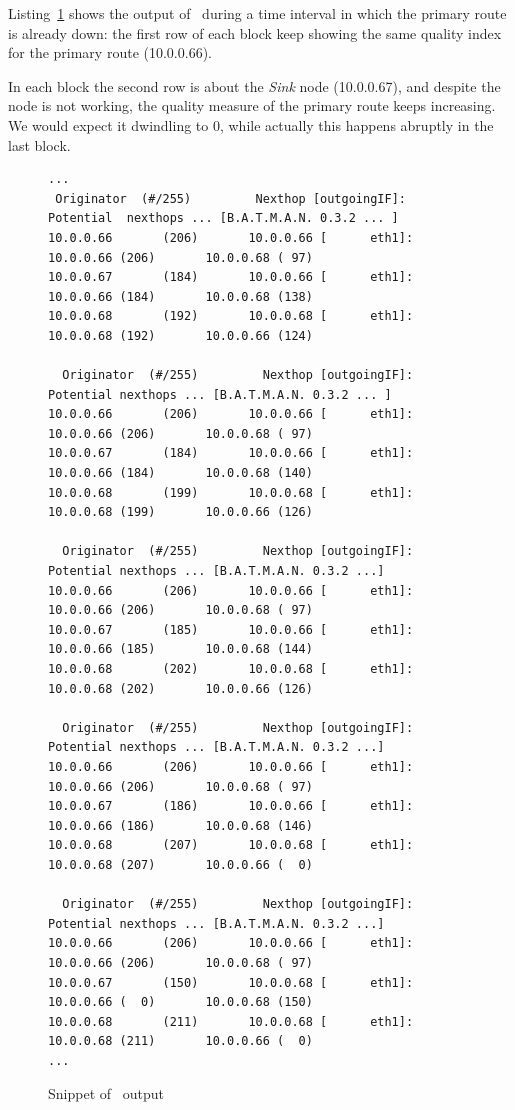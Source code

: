     Listing~\ref{lst:batman_log} shows the output of \batman\ during a
    time interval in which the primary route is already down: the first
    row of each block keep showing the same quality index for the primary
    route (10.0.0.66).

    In each block the second row is about the \emph{Sink} node
    (10.0.0.67), and despite the node is not working, the quality measure
    of the primary route keeps increasing. We would expect it dwindling to
    0, while actually this happens abruptly in the last block.

\begin{figure}[tbhp]
\begin{Verbatim}[fontsize=\footnotesize]
...
 Originator  (#/255)         Nexthop [outgoingIF]:   Potential  nexthops ... [B.A.T.M.A.N. 0.3.2 ... ]
10.0.0.66       (206)       10.0.0.66 [      eth1]:       10.0.0.66 (206)       10.0.0.68 ( 97)
10.0.0.67       (184)       10.0.0.66 [      eth1]:       10.0.0.66 (184)       10.0.0.68 (138)
10.0.0.68       (192)       10.0.0.68 [      eth1]:       10.0.0.68 (192)       10.0.0.66 (124)

  Originator  (#/255)         Nexthop [outgoingIF]:   Potential nexthops ... [B.A.T.M.A.N. 0.3.2 ... ]
10.0.0.66       (206)       10.0.0.66 [      eth1]:       10.0.0.66 (206)       10.0.0.68 ( 97)
10.0.0.67       (184)       10.0.0.66 [      eth1]:       10.0.0.66 (184)       10.0.0.68 (140)
10.0.0.68       (199)       10.0.0.68 [      eth1]:       10.0.0.68 (199)       10.0.0.66 (126)

  Originator  (#/255)         Nexthop [outgoingIF]:   Potential nexthops ... [B.A.T.M.A.N. 0.3.2 ...]
10.0.0.66       (206)       10.0.0.66 [      eth1]:       10.0.0.66 (206)       10.0.0.68 ( 97)
10.0.0.67       (185)       10.0.0.66 [      eth1]:       10.0.0.66 (185)       10.0.0.68 (144)
10.0.0.68       (202)       10.0.0.68 [      eth1]:       10.0.0.68 (202)       10.0.0.66 (126)

  Originator  (#/255)         Nexthop [outgoingIF]:   Potential nexthops ... [B.A.T.M.A.N. 0.3.2 ...]
10.0.0.66       (206)       10.0.0.66 [      eth1]:       10.0.0.66 (206)       10.0.0.68 ( 97)
10.0.0.67       (186)       10.0.0.66 [      eth1]:       10.0.0.66 (186)       10.0.0.68 (146)
10.0.0.68       (207)       10.0.0.68 [      eth1]:       10.0.0.68 (207)       10.0.0.66 (  0)

  Originator  (#/255)         Nexthop [outgoingIF]:   Potential nexthops ... [B.A.T.M.A.N. 0.3.2 ...]
10.0.0.66       (206)       10.0.0.66 [      eth1]:       10.0.0.66 (206)       10.0.0.68 ( 97)
10.0.0.67       (150)       10.0.0.68 [      eth1]:       10.0.0.66 (  0)       10.0.0.68 (150)
10.0.0.68       (211)       10.0.0.68 [      eth1]:       10.0.0.68 (211)       10.0.0.66 (  0)
...
\end{Verbatim}
\caption{Snippet of \batman\ output}
\label{lst:batman_log}
\end{figure}

